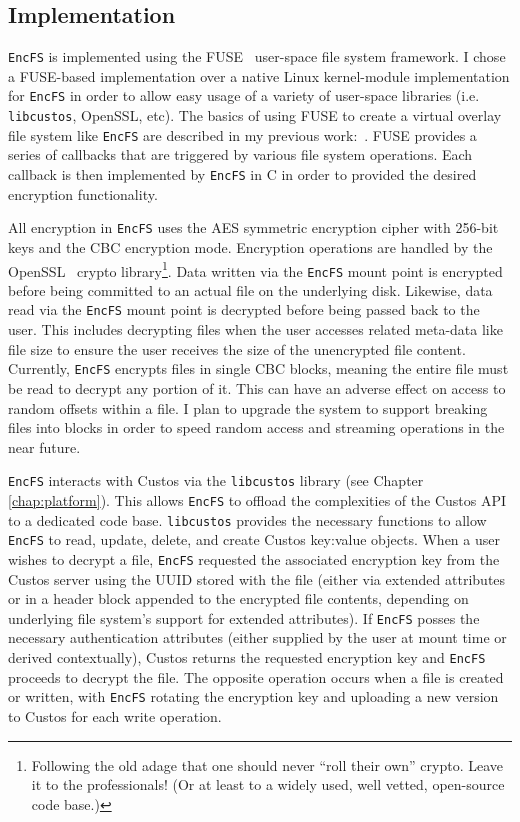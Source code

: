 \subsection{Implementation}

\texttt{EncFS} is implemented using the FUSE~\cite{fuse} user-space
file system framework. I chose a FUSE-based implementation over a
native Linux kernel-module implementation for \texttt{EncFS} in order
to allow easy usage of a variety of user-space libraries
(i.e. \texttt{libcustos}, OpenSSL, etc). The basics of using FUSE to
create a virtual overlay file system like \texttt{EncFS} are described
in my previous work:~\cite{sayler-os-encfs}. FUSE provides a series of
callbacks that are triggered by various file system operations. Each
callback is then implemented by \texttt{EncFS} in C in order to
provided the desired encryption functionality.

All encryption in \texttt{EncFS} uses the AES symmetric encryption
cipher with 256-bit keys and the CBC encryption mode. Encryption
operations are handled by the OpenSSL~\cite{openssl} crypto
library\footnote{Following the old adage that one should never ``roll
  their own'' crypto. Leave it to the professionals! (Or at least to a
  widely used, well vetted, open-source code base.)}. Data written via
the \texttt{EncFS} mount point is encrypted before being committed to
an actual file on the underlying disk. Likewise, data read via the
\texttt{EncFS} mount point is decrypted before being passed back to
the user. This includes decrypting files when the user accesses
related meta-data like file size to ensure the user receives the size
of the unencrypted file content. Currently, \texttt{EncFS} encrypts
files in single CBC blocks, meaning the entire file must be read to
decrypt any portion of it. This can have an adverse effect on access
to random offsets within a file. I plan to upgrade the system to
support breaking files into blocks in order to speed random access and
streaming operations in the near future.

\texttt{EncFS} interacts with Custos via the \texttt{libcustos}
library (see Chapter \ref{chap:platform}). This allows \texttt{EncFS}
to offload the complexities of the Custos API to a dedicated code
base. \texttt{libcustos} provides the necessary functions to allow
\texttt{EncFS} to read, update, delete, and create Custos key:value
objects. When a user wishes to decrypt a file, \texttt{EncFS}
requested the associated encryption key from the Custos server using
the UUID stored with the file (either via extended attributes or in a
header block appended to the encrypted file contents, depending on
underlying file system's support for extended attributes). If
\texttt{EncFS} posses the necessary authentication attributes (either
supplied by the user at mount time or derived contextually), Custos
returns the requested encryption key and \texttt{EncFS} proceeds to
decrypt the file. The opposite operation occurs when a file is created
or written, with \texttt{EncFS} rotating the encryption key and
uploading a new version to Custos for each write operation.

